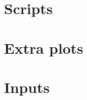 \documentclass[11pt,letterpaper]{report}
\begin{document}
	
	
	
	\appendix
	
	\chapter[Scripts]{Scripts}
	
	\chapter{Extra plots}
	
	\chapter{Inputs}
	
	
	
	
	
	
	
\end{document}
